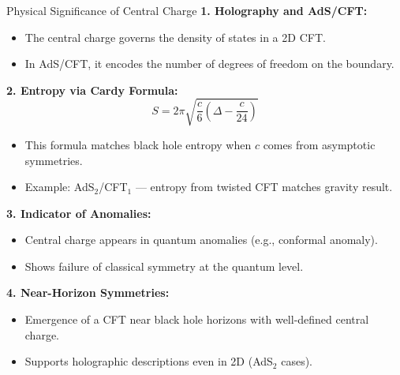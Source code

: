 \begin{frame}[allowframebreaks]{Physical Significance of Central Charge}
\textbf{1. Holography and AdS/CFT:}
\begin{itemize}
  \item The central charge governs the density of states in a 2D CFT.
  \item In AdS/CFT, it encodes the number of degrees of freedom on the boundary.
\end{itemize}

\textbf{2. Entropy via Cardy Formula:}
\[S = 2\pi \sqrt{\frac{c}{6} \left( \Delta - \frac{c}{24} \right)}\]

\begin{itemize}
  \item This formula matches black hole entropy when \( c \) comes from asymptotic symmetries.
  \item Example: AdS\(_2\)/CFT\(_1\) — entropy from twisted CFT matches gravity result.
\end{itemize}

\textbf{3. Indicator of Anomalies:}
\begin{itemize}
  \item Central charge appears in quantum anomalies (e.g., conformal anomaly).
  \item Shows failure of classical symmetry at the quantum level.
\end{itemize}

\textbf{4. Near-Horizon Symmetries:}
\begin{itemize}
  \item Emergence of a CFT near black hole horizons with well-defined central charge.
  \item Supports holographic descriptions even in 2D (AdS\(_2\) cases).
\end{itemize}
\end{frame}

